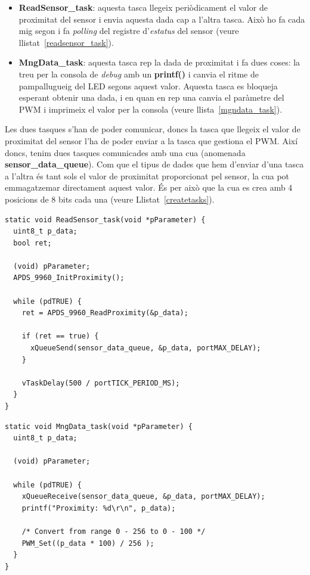 \begin{itemize}
 \item {\bf ReadSensor\_task}: aquesta tasca llegeix periòdicament el valor de proximitat del sensor i envia aquesta dada cap a l'altra tasca. Això ho fa cada mig segon i fa {\em polling} del registre d'{\em estatus} del sensor (veure llistat~\ref{readsensor_task}).
 \item {\bf MngData\_task}: aquesta tasca rep la dada de proximitat i fa dues coses: la treu per la consola de {\em debug} amb un {\bf printf()} i canvia el ritme de pampallugueig del LED segons aquest valor. Aquesta tasca es bloqueja esperant obtenir una dada, i en quan en rep una canvia el paràmetre del \gls{PWM} i imprimeix el valor per la consola (veure llista~\ref{mgndata_task}).
\end{itemize}

Les dues tasques s'han de poder comunicar, doncs la tasca que llegeix el valor de proximitat del sensor l'ha de poder enviar a la tasca que gestiona el \gls{PWM}. Així doncs, tenim dues tasques comunicades amb una cua (anomenada {\bf sensor\_data\_queue}). Com que el tipus de dades que hem d'enviar d'una tasca a l'altra és tant sols el valor de proximitat proporcionat pel sensor, la cua pot emmagatzemar directament aquest valor. És per això que la cua es crea amb 4 posicions de 8 bits cada una (veure Llistat~\ref{createtasks}).

\begin{lstlisting}[style=customc,caption={Tasca ReadSensor },label=readsensor_task]
static void ReadSensor_task(void *pParameter) {
  uint8_t p_data;
  bool ret;

  (void) pParameter;
  APDS_9960_InitProximity();

  while (pdTRUE) {
    ret = APDS_9960_ReadProximity(&p_data);

    if (ret == true) {
      xQueueSend(sensor_data_queue, &p_data, portMAX_DELAY);
    }

    vTaskDelay(500 / portTICK_PERIOD_MS);
  }
}
\end{lstlisting}

\begin{lstlisting}[style=customc,caption={Tasca MngData},label=mgndata_task]
static void MngData_task(void *pParameter) {
  uint8_t p_data;

  (void) pParameter;

  while (pdTRUE) {
    xQueueReceive(sensor_data_queue, &p_data, portMAX_DELAY);
    printf("Proximity: %d\r\n", p_data);

    /* Convert from range 0 - 256 to 0 - 100 */
    PWM_Set((p_data * 100) / 256 );
  }
}
\end{lstlisting}



